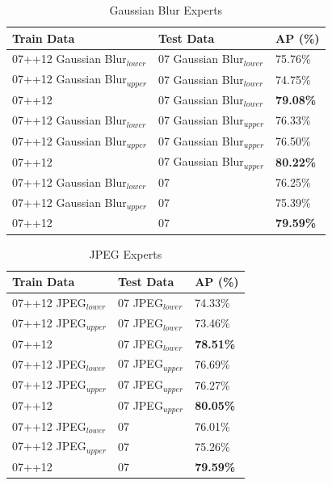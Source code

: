 \begin{table}[h]
\centering
\caption{Gaussian Blur Experts}
\label{tab:gb_experts}
\begin{tabular}{|l|l|l|}
\hline
\textbf{Train Data}           & \textbf{Test Data}        & \textbf{AP (\%)} \\ \hline
07++12 Gaussian Blur$_{lower}$ & 07 Gaussian Blur$_{lower}$ & 75.76\% \\ \hline
07++12 Gaussian Blur$_{upper}$ & 07 Gaussian Blur$_{lower}$ & 74.75\% \\ \hline
07++12               & 07 Gaussian Blur$_{lower}$ & \textbf{79.08\%} \\ \hline
07++12 Gaussian Blur$_{lower}$ & 07 Gaussian Blur$_{upper}$ & 76.33\% \\ \hline
07++12 Gaussian Blur$_{upper}$ & 07 Gaussian Blur$_{upper}$ & 76.50\% \\ \hline
07++12               & 07 Gaussian Blur$_{upper}$ & \textbf{80.22\%} \\ \hline
07++12 Gaussian Blur$_{lower}$ & 07               & 76.25\% \\ \hline
07++12 Gaussian Blur$_{upper}$ & 07               & 75.39\% \\ \hline
07++12               & 07               & \textbf{79.59\%} \\ \hline
\end{tabular}
\end{table}



\begin{table}[h]
\centering
\caption{JPEG Experts}
\label{tab:jpeg_experts}
\begin{tabular}{|l|l|l|}
\hline
\textbf{Train Data}           & \textbf{Test Data}        & \textbf{AP (\%)} \\ \hline
07++12 JPEG$_{lower}$ & 07 JPEG$_{lower}$ & 74.33\% \\ \hline
07++12 JPEG$_{upper}$ & 07 JPEG$_{lower}$ & 73.46\% \\ \hline
07++12               & 07 JPEG$_{lower}$ & \textbf{78.51\%} \\ \hline
07++12 JPEG$_{lower}$ & 07 JPEG$_{upper}$ & 76.69\% \\ \hline
07++12 JPEG$_{upper}$ & 07 JPEG$_{upper}$ & 76.27\% \\ \hline
07++12               & 07 JPEG$_{upper}$ & \textbf{80.05\%} \\ \hline
07++12 JPEG$_{lower}$ & 07               & 76.01\% \\ \hline
07++12 JPEG$_{upper}$ & 07               & 75.26\% \\ \hline
07++12               & 07               & \textbf{79.59\%} \\ \hline
\end{tabular}
\end{table}

